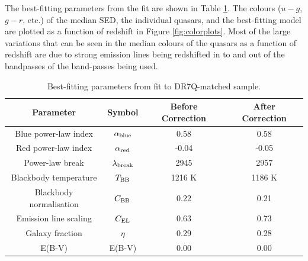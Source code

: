 The best-fitting parameters from the fit are shown in Table \ref{tab:params}. The colours ($u - g$, $g - r$, etc.) of the median SED, the individual quasars, and the best-fitting model are plotted as a function of redshift in Figure \ref{fig:colorplots}.  Most of the large variations that can be seen in the median colours of the quasars as a function of redshift are due to strong emission lines being redshifted in to and out of the bandpasses of the band-passes being used. 



\begin{table}
  \centering
  \begin{tabular}{c c c c}
    \hline 
    Parameter & Symbol & Before Correction & After Correction \\
    \hline 
    Blue power-law index & $\alpha_{\rm blue}$ & 0.58 & 0.58 \\
    Red power-law index & $\alpha_{\rm red}$ & -0.04 & -0.05 \\
    Power-law break & $\lambda_{\rm break}$ & 2945 & 2957 \\
    Blackbody temperature & $T_{\rm BB}$ & 1216 K & 1186 K \\
    Blackbody normalisation & $C_{\rm BB}$ & 0.22 & 0.21 \\
    Emission line scaling & $C_{\rm EL}$  & 0.63 &  0.73 \\
    Galaxy fraction & $\eta$ & 0.29 & 0.28 \\
    E(B-V) & E(B-V) & 0.00 & 0.00 \\
    \hline
  \end{tabular}
  \caption{Best-fitting parameters from fit to DR7Q-matched sample.}
  \label{tab:params}
\end{table}

